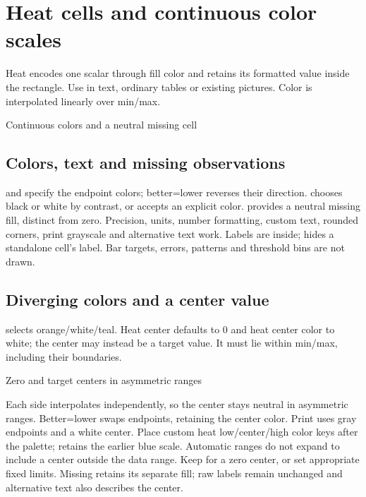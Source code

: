 \section{Heat cells and continuous color scales}
\label{sec:heat}
Heat encodes one scalar through fill color and retains its formatted value inside
the rectangle. Use  in text, ordinary tables or
existing \manualTikZ{} pictures. Color is interpolated linearly over min/max.
\begin{demo}{Continuous colors and a neutral missing cell}
\quad
{}\quad
{}\quad
{}
\end{demo}
\subsection{Colors, text and missing observations}
\begin{sloppypar}
 and  specify the endpoint colors;
better=lower reverses their direction.  chooses black
or white by contrast, or accepts an explicit color. 
provides a neutral missing fill, distinct from zero. Precision, units, number
formatting, custom text, rounded corners, print grayscale and alternative text
work. Labels are inside;  hides a standalone cell's label. Bar targets,
errors, patterns and threshold bins are not drawn.
\end{sloppypar}
\subsection{Diverging colors and a center value}
 selects orange/white/teal. Heat center defaults to
0 and heat center color to white; the center may instead be a target value.
It must lie within min/max, including their boundaries.
\begin{demo}{Zero and target centers in asymmetric ranges}
\quad
{}\quad
{}

\quad
{}\quad
{}
\end{demo}
Each side interpolates independently, so the center stays neutral in asymmetric
ranges. Better=lower swaps endpoints, retaining the center color. Print uses
gray endpoints and a white center. Place custom heat low/center/high color keys
after the palette;  retains the earlier blue scale.
Automatic ranges do not expand to include a center outside the data range.
Keep  for a zero center, or set appropriate fixed limits.
Missing retains its separate fill; raw labels remain unchanged and alternative
text also describes the center.

